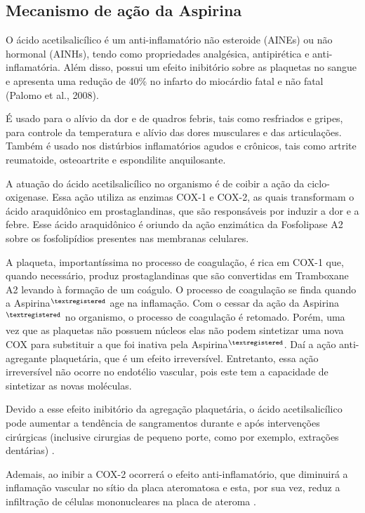 \subsection{Mecanismo de ação da Aspirina}

 O ácido acetilsalicílico é um anti-inflamatório não esteroide (AINEs) ou não hormonal (AINHs), tendo como       propriedades analgésica, antipirética e anti-inflamatória. Além disso, possui um efeito inibitório sobre
as plaquetas no sangue e apresenta uma redução de 40\% no infarto do miocárdio fatal e não fatal (Palomo
et al., 2008).

É usado para o alívio da dor e de quadros febris, tais como resfriados e gripes, para controle da
temperatura e alívio das dores musculares e das articulações. Também é usado nos distúrbios inflamatórios
agudos e crônicos, tais como artrite reumatoide, osteoartrite e espondilite
anquilosante.\cite{bulaaspirina}

A atuação do ácido acetilsalicílico no organismo é de coibir a ação da ciclo-oxigenase. Essa ação utiliza
as enzimas COX-1 e COX-2, as quais transformam o ácido araquidônico em prostaglandinas, que são
responsáveis por induzir a dor e a febre. Esse ácido araquidônico é oriundo da ação enzimática da
Fosfolipase A2 sobre os fosfolipídios presentes nas membranas celulares. 

A plaqueta, importantíssima no processo de coagulação, é rica em COX-1 que, quando necessário, produz
prostaglandinas que são convertidas em Tramboxane A2 levando à formação de um coágulo. O processo de
coagulação se finda quando a Aspirina$^{\tiny{\textregistered}}$ age na inflamação. Com o cessar da ação
da Aspirina$^{\tiny{\textregistered}}$ no organismo, o processo de coagulação é retomado. Porém, uma vez
que as plaquetas não possuem núcleos elas não podem sintetizar uma nova COX para substituir a que foi
inativa pela Aspirina$^{\tiny{\textregistered}}$. Daí a ação anti-agregante plaquetária, que é um efeito
irreversível. Entretanto, essa ação irreversível não ocorre no endotélio vascular, pois este tem a
capacidade de sintetizar as novas moléculas. 

Devido a esse efeito inibitório da agregação plaquetária, o ácido acetilsalicílico pode aumentar a
tendência de sangramentos durante e após intervenções cirúrgicas (inclusive cirurgias de pequeno porte,
como por exemplo, extrações dentárias) \cite{bulaaspirina}.

Ademais, ao inibir a COX-2 ocorrerá o efeito anti-inflamatório, que diminuirá a inflamação vascular no
sítio da placa ateromatosa e esta, por sua vez, reduz a infiltração de células mononucleares na placa de
ateroma \cite{Grassi2012}.

